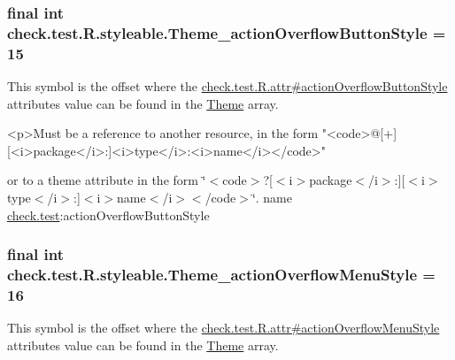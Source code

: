 \subsubsection[{Theme\+\_\+action\+Overflow\+Button\+Style}]{\setlength{\rightskip}{0pt plus 5cm}final int check.\+test.\+R.\+styleable.\+Theme\+\_\+action\+Overflow\+Button\+Style = 15\hspace{0.3cm}{\ttfamily [static]}}\label{classcheck_1_1test_1_1_r_1_1styleable_a43f29fc1f3579d42bcc1e4bbd4c853c6}
This symbol is the offset where the \hyperlink{classcheck_1_1test_1_1_r_1_1attr_a79f86eddf8f5ddb696413fb8240e9978}{check.\+test.\+R.\+attr\#action\+Overflow\+Button\+Style} attribute\textquotesingle{}s value can be found in the \hyperlink{classcheck_1_1test_1_1_r_1_1styleable_acca726d02016a0cf607782ec3a436a81}{Theme} array.

\begin{DoxyVerb}      <p>Must be a reference to another resource, in the form "<code>@[+][<i>package</i>:]<i>type</i>:<i>name</i></code>"
\end{DoxyVerb}
 or to a theme attribute in the form \char`\"{}$<$code$>$?\mbox{[}$<$i$>$package$<$/i$>$\+:\mbox{]}\mbox{[}$<$i$>$type$<$/i$>$\+:\mbox{]}$<$i$>$name$<$/i$>$$<$/code$>$\char`\"{}.  name \hyperlink{namespacecheck_1_1test}{check.\+test}\+:action\+Overflow\+Button\+Style \hypertarget{classcheck_1_1test_1_1_r_1_1styleable_a56ea39fe4c79a7e03d3181b96f1995f3}{}
\subsubsection[{Theme\+\_\+action\+Overflow\+Menu\+Style}]{\setlength{\rightskip}{0pt plus 5cm}final int check.\+test.\+R.\+styleable.\+Theme\+\_\+action\+Overflow\+Menu\+Style = 16\hspace{0.3cm}{\ttfamily [static]}}\label{classcheck_1_1test_1_1_r_1_1styleable_a56ea39fe4c79a7e03d3181b96f1995f3}
This symbol is the offset where the \hyperlink{classcheck_1_1test_1_1_r_1_1attr_adf07fdf83e0f7e3666ca3c62d9051738}{check.\+test.\+R.\+attr\#action\+Overflow\+Menu\+Style} attribute\textquotesingle{}s value can be found in the \hyperlink{classcheck_1_1test_1_1_r_1_1styleable_acca726d02016a0cf607782ec3a436a81}{Theme} array.

